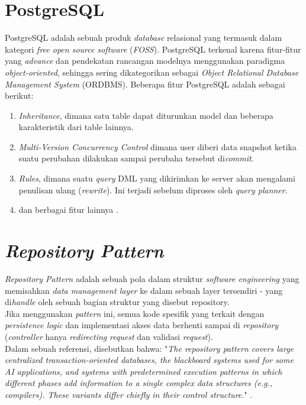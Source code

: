 	\section{  PostgreSQL}
	PostgreSQL adalah sebuah produk \textit{database} relasional yang termasuk dalam kategori \textit{free open source software} (\textit{FOSS}). 
	PostgreSQL terkenal karena fitur-fitur yang \textit{advance} dan pendekatan rancangan modelnya menggunakan paradigma \textit{object-oriented}, sehingga sering dikategorikan sebagai \textit{Object Relational Database Management System} (ORDBMS).
	Beberapa fitur PostgreSQL adalah sebagai berikut:
	\begin{enumerate}
	   	\item \textit{Inheritance}, dimana satu table dapat diturunkan model dan beberapa karakteristik dari table lainnya.
	   	\item \textit{Multi-Version Concurrency Control} dimana user diberi data snapshot ketika suatu perubahan dilakukan sampai perubaha tersebut di\textit{commit}.
	   	\item \textit{Rules}, dimana suatu \textit{query} DML yang dikirimkan ke server akan mengalami penulisan ulang (\textit{rewrite}). Ini terjadi sebelum diproses oleh \textit{query planner}.
	   	\item dan berbagai fitur lainnya \cite{noauthor_postgresql_nodate}.
	\end{enumerate}
		
	\section{  \textit{Repository Pattern}}
	\textit{Repository Pattern} adalah sebuah pola dalam struktur \textit{software engineering} yang memisahkan \textit{data management layer} ke dalam sebuah layer tersendiri - yang di\textit{handle} oleh sebuah bagian struktur yang disebut repository. 
	\\ \indent
	Jika menggunakan \textit{pattern} ini, semua kode spesifik yang terkait dengan \textit{persistence logic} dan implementasi akses data berhenti sampai di \textit{repository} (\textit{controller} hanya \textit{redirecting} \textit{request} dan validasi \textit{request})\cite{noauthor_repository_2016}.
	\\ \indent
	Dalam sebuah referensi, disebutkan bahwa: "\textit{The repository pattern covers large centralized transaction-oriented databases, the blackboard systems used for some AI applications, and systems with predetermined execution patterns in which different phases add information to a single complex data structures (e.g., compilers). These variants differ chiefly in their control structure.}" \cite{shaw_patterns_1996}.
	
